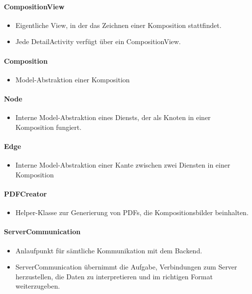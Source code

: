 \paragraph{CompositionView}
\begin{itemize}
	\item Eigentliche View, in der das Zeichnen einer Komposition stattfindet. 
	\item Jede DetailActivity verfügt über ein CompositionView. 
\end{itemize}
\paragraph{Composition}
\begin{itemize}
	\item Model-Abstraktion einer Komposition 
\end{itemize}
\paragraph{Node}
\begin{itemize}
	\item Interne Model-Abstraktion eines Diensts, der als Knoten in einer Komposition fungiert. 
\end{itemize}
\paragraph{Edge} 
\begin{itemize}
	\item Interne Model-Abstraktion einer Kante zwischen zwei Diensten in einer Komposition 
\end{itemize}
\paragraph{PDFCreator}
\begin{itemize}
	\item Helper-Klasse zur Generierung von PDFs, die Kompositionsbilder beinhalten. 
\end{itemize}

\paragraph{ServerCommunication}
\begin{itemize} 
	\item Anlaufpunkt für sämtliche Kommunikation mit dem Backend. 
	\item ServerCommunication übernimmt die Aufgabe, Verbindungen zum Server herzustellen, die Daten zu interpretieren und im richtigen Format weiterzugeben. 
\end{itemize}
